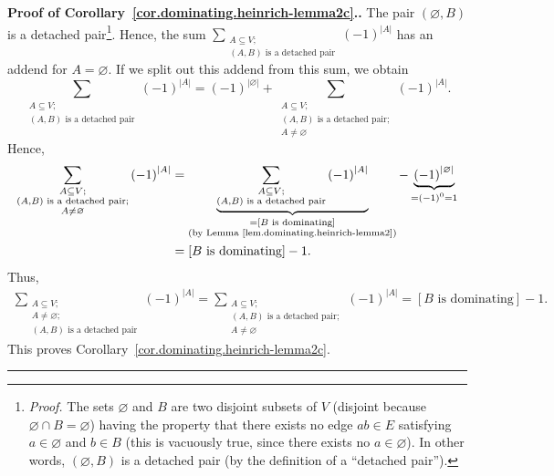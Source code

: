 \documentclass[numbers=enddot,12pt,final,onecolumn,notitlepage]{scrartcl}%
\theoremstyle{definition}
\newenvironment{proof}[1][Proof]{\noindent\textbf{#1.} }{\ \rule{0.5em}{0.5em}}
\let\sumnonlimits\sum
\renewcommand{\sum}{\sumnonlimits\limits}
\newcommand{\abs}[1]{\left| #1 \right|}
\newcommand{\tup}[1]{\left( #1 \right)}
\newcommand{\ive}[1]{\left[ #1 \right]}
\begin{document}
\begin{proof}[Proof of Corollary~\ref{cor.dominating.heinrich-lemma2c}.]
The pair $\tup{\varnothing, B}$ is a detached
pair\footnote{\textit{Proof.} The sets
$\varnothing$ and $B$ are two disjoint subsets of $V$
(disjoint because $\varnothing \cap B = \varnothing$)
having the property that there exists no edge
$ab \in E$ satisfying $a \in \varnothing$ and $b \in B$
(this is vacuously true, since there exists no
$a \in \varnothing$). In other words, $\tup{\varnothing, B}$ is
a detached pair (by the definition of a ``detached pair'').}.
Hence, the sum \newline
$\sum_{\substack{A \subseteq V; \\ \tup{A, B}
\text{ is a detached pair}}} \tup{-1}^{\abs{A}}$
has an addend for $A = \varnothing$. If we split out this addend
from this sum, we obtain
\[
\sum_{\substack{A \subseteq V; \\ \tup{A, B}
\text{ is a detached pair}}} \tup{-1}^{\abs{A}}
=
\tup{-1}^{\abs{\varnothing}}
+
\sum_{\substack{A \subseteq V; \\ \tup{A, B}
\text{ is a detached pair}; \\ A \neq \varnothing}}
\tup{-1}^{\abs{A}} .
\]
Hence,
\begin{align*}
\sum_{\substack{A \subseteq V; \\ \tup{A, B}
\text{ is a detached pair}; \\ A \neq \varnothing}}
\tup{-1}^{\abs{A}}
&=
\underbrace{\sum_{\substack{A \subseteq V; \\ \tup{A, B}
             \text{ is a detached pair}}} \tup{-1}^{\abs{A}}}
           _{\substack{= \ive{B \text{ is dominating}} \\
             \text{(by Lemma~\ref{lem.dominating.heinrich-lemma2})}}}
- \underbrace{\tup{-1}^{\abs{\varnothing}}}_{
                =\tup{-1}^0=1} \\
&= \ive{B \text{ is dominating}} - 1.
\end{align*}
Thus,
\begin{align*}
\sum_{\substack{A \subseteq V; \\ A \neq \varnothing; \\
\tup{A, B} \text{ is a detached pair}}}
\tup{-1}^{\abs{A}}
= \sum_{\substack{A \subseteq V; \\ \tup{A, B}
\text{ is a detached pair}; \\ A \neq \varnothing}}
\tup{-1}^{\abs{A}}
= \ive{B \text{ is dominating}} - 1.
\end{align*}
This proves Corollary~\ref{cor.dominating.heinrich-lemma2c}.
\end{proof}
\end{document}
